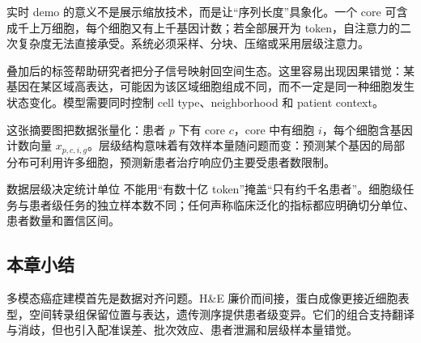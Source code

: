 
实时 demo 的意义不是展示缩放技术，而是让“序列长度”具象化。一个 core 可含成千上万细胞，每个细胞又有上千基因计数；若全部展开为 token，自注意力的二次复杂度无法直接承受。系统必须采样、分块、压缩或采用层级注意力。


叠加后的标签帮助研究者把分子信号映射回空间生态。这里容易出现因果错觉：某基因在某区域高表达，可能因为该区域细胞组成不同，而不一定是同一种细胞发生状态变化。模型需要同时控制 cell type、neighborhood 和 patient context。


这张摘要图把数据张量化：患者 $p$ 下有 core $c$，core 中有细胞 $i$，每个细胞含基因计数向量 $x_{p,c,i,g}$。层级结构意味着有效样本量随问题而变：预测某个基因的局部分布可利用许多细胞，预测新患者治疗响应仍主要受患者数限制。

\begin{importantbox}{数据层级决定统计单位}
不能用“有数十亿 token”掩盖“只有约千名患者”。细胞级任务与患者级任务的独立样本数不同；任何声称临床泛化的指标都应明确切分单位、患者数量和置信区间。
\end{importantbox}


\subsection{本章小结}

多模态癌症建模首先是数据对齐问题。H\&E 廉价而间接，蛋白成像更接近细胞表型，空间转录组保留位置与表达，遗传测序提供患者级变异。它们的组合支持翻译与消歧，但也引入配准误差、批次效应、患者泄漏和层级样本量错觉。

